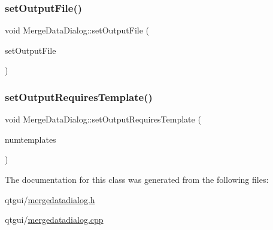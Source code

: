 \subsubsection{\texorpdfstring{setOutputFile()}{setOutputFile()}}
{\footnotesize\ttfamily void Merge\+Data\+Dialog\+::set\+Output\+File (\begin{DoxyParamCaption}\item[{Q\+String}]{set\+Output\+File }\end{DoxyParamCaption})}

\mbox{\label{class_merge_data_dialog_a93b71e8d08d45326247c887897ddb2c7}} 
\subsubsection{\texorpdfstring{setOutputRequiresTemplate()}{setOutputRequiresTemplate()}}
{\footnotesize\ttfamily void Merge\+Data\+Dialog\+::set\+Output\+Requires\+Template (\begin{DoxyParamCaption}\item[{int}]{numtemplates }\end{DoxyParamCaption})\hspace{0.3cm}{\ttfamily [inline]}}



The documentation for this class was generated from the following files\+:\begin{DoxyCompactItemize}
\item 
qtgui/\mbox{\hyperlink{mergedatadialog_8h}{mergedatadialog.\+h}}\item 
qtgui/\mbox{\hyperlink{mergedatadialog_8cpp}{mergedatadialog.\+cpp}}\end{DoxyCompactItemize}
